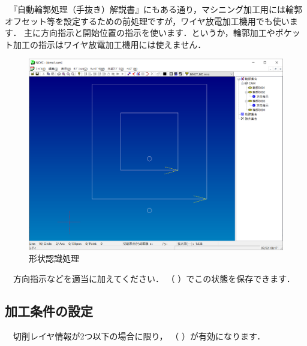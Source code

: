 　『自動輪郭処理（手抜き）解説書』にもある通り，マシニング加工用には輪郭オフセット等を設定するための前処理ですが，ワイヤ放電加工機用でも使います．
主に方向指示と開始位置の指示を使います．というか，輪郭加工やポケット加工の指示はワイヤ放電加工機用には使えません．

\begin{figure}[H]
\centering
\includegraphics[scale=0.5]{No1/fig/keijyo.png}
\caption{形状認識処理}
\label{fig:keijyo.png}
\end{figure}

　方向指示などを適当に加えてください．
（\,\,）でこの状態を保存できます．

\newpage %
\subsection{加工条件の設定}
　切削レイヤ情報が2つ以下の場合に限り，
（\,\,）が有効になります．


